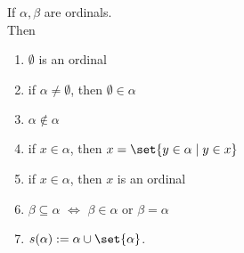 \begin{proposition}\label{prop:1}
    If $\alpha, \beta$ are ordinals.\\
    Then 
    \begin{enumerate}[label=(\arabic*)]
        \item $\emptyset$ is an ordinal
        \item if $\alpha \ne \emptyset$, then $\emptyset \in \alpha$
        \item $\alpha \notin \alpha$
        \item if $x \in \alpha$, then $x = \set{y \in \alpha \mid y \in x}$
        \item if $x \in \alpha$, then $x$ is an ordinal
        \item $\beta \subseteq \alpha$ $\iff$ $\beta \in \alpha$ or $\beta = \alpha$
        \item $s(\alpha) := \alpha \cup \set{\alpha}$.
    \end{enumerate}
\end{proposition}

